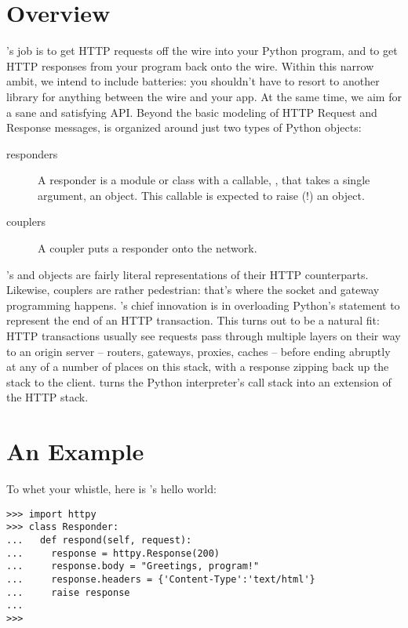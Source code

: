 \section{Overview}

's job is to get HTTP requests off the wire into your Python
program, and to get HTTP responses from your program back onto the wire. Within
this narrow ambit, we intend to include batteries: you shouldn't have to resort
to another library for anything between the wire and your app. At the same time,
we aim for a sane and satisfying API. Beyond the basic modeling of HTTP Request
and Response messages,  is organized around just two types of
Python objects:

\begin{description}

\item[responders]
    {A responder is a module or class with a callable, , that
    takes a single argument, an  object. This callable is
    expected to raise (!) an  object.}

\item[couplers]
    {A coupler puts a responder onto the network.}

\end{description}

's  and  objects are fairly literal
representations of their HTTP counterparts. Likewise, couplers are rather
pedestrian: that's where the socket and gateway programming happens.
's chief innovation is in overloading Python's 
statement to represent the end of an HTTP transaction. This turns out to be a
natural fit: HTTP transactions usually see requests pass through multiple layers
on their way to an origin server -- routers, gateways, proxies, caches -- before
ending abruptly at any of a number of places on this stack, with a response
zipping back up the stack to the client.  turns the Python
interpreter's call stack into an extension of the HTTP stack.



\section{An Example}

To whet your whistle, here is 's hello world:

\begin{verbatim}
>>> import httpy
>>> class Responder:
...   def respond(self, request):
...     response = httpy.Response(200)
...     response.body = "Greetings, program!"
...     response.headers = {'Content-Type':'text/html'}
...     raise response
...
>>>
\end{verbatim}

